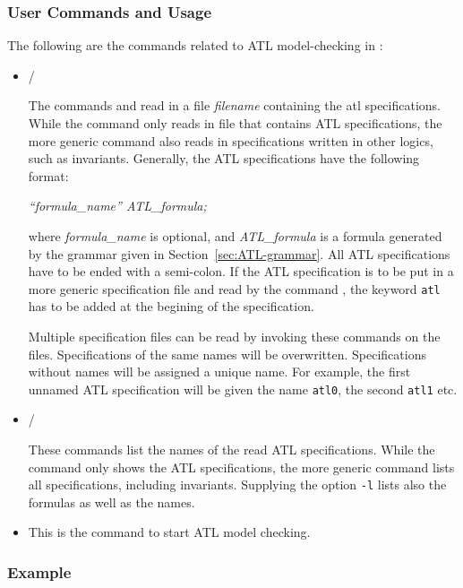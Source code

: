 \subsubsection{User Commands and Usage}
The following are the commands related to ATL model-checking in \mocha:
\begin{itemize}
\item
{} / 

The commands \readSpec and \atlRead read in a file {\it filename} containing the atl
specifications. While the command \atlRead only reads in file that contains
ATL specifications, the more generic command \readSpec also reads in
specifications written in other logics, such as invariants.  Generally, the
ATL specifications have the following format:
\begin{center}
{\it ``formula\_name'' ATL\_formula;}
\end{center}
where {\it formula\_name} is optional, and {\it ATL\_formula} is a formula generated
by the grammar given in Section~\ref{sec:ATL-grammar}. All ATL
specifications have to be ended with a semi-colon. If the ATL specification
is to be put in a more generic specification file and read by the command
\readSpec, the keyword {\tt atl} has to be added at the begining of the 
specification.  

Multiple specification files can be read by invoking these commands
on the files. Specifications of the same names will be
overwritten. Specifications without names will be assigned a unique name.
For example, the first unnamed ATL specification will be given the name
{\tt atl0}, the second {\tt atl1} etc.


\item
\showSpec {\tt [-l]}/ \atlShow {\tt [-l]}

These commands list the names of the read ATL
specifications. While the command \atlShow only shows the ATL
specifications, the more generic command \showSpec lists all specifications,
including invariants. Supplying the option {\tt -l} lists also the formulas
as well as the names.

\item
{}

This is the command to start ATL model checking. 

\end{itemize}

\subsubsection{Example}



